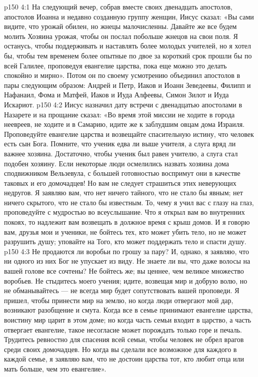 \vs p150 4:1 На следующий вечер, собрав вместе своих двенадцать апостолов, апостолов Иоанна и недавно созданную группу женщин, Иисус сказал: «Вы сами видите, что урожай обилен, но жнецы малочисленны. Давайте же все будем молить Хозяина урожая, чтобы он послал побольше жнецов на свои поля. Я останусь, чтобы поддерживать и наставлять более молодых учителей, но я хотел бы, чтобы тем временем более опытные по двое за короткий срок прошли бы по всей Галилее, проповедуя евангелие царства, пока еще можно это делать спокойно и мирно». Потом он по своему усмотрению объединил апостолов в пары следующим образом: Андрей и Петр, Иаков и Иоанн Зеведеевы, Филипп и Нафанаил, Фома и Матфей, Иаков и Иуда Алфеевы, Симон Зилот и Иуда Искариот.
\vs p150 4:2 Иисус назначил дату встречи с двенадцатью апостолами в Назарете и на прощание сказал: «Во время этой миссии не ходите в города неевреев, не ходите и в Самарию, идите же к заблудшим овцам дома Израиля. Проповедуйте евангелие царства и возвещайте спасительную истину, что человек есть сын Бога. Помните, что ученик едва ли выше учителя, а слуга вряд ли важнее хозяина. Достаточно, чтобы ученик был равен учителю, а слуга стал подобен хозяину. Если некоторые люди осмелились назвать хозяина дома сподвижником Вельзевула, с большей готовностью воспримут они в качестве таковых и его домочадцев! Но вам не следует страшиться этих неверующих недругов. Я заявляю вам, что нет ничего тайного, что не стало бы явным; нет ничего скрытого, что не стало бы известным. То, чему я учил вас с глазу на глаз, проповедуйте с мудростью во всеуслышание. Что я открыл вам во внутренних покоях, то надлежит вам возвещать в должное время с крыш домов. И я говорю вам, друзья мои и ученики, не бойтесь тех, кто может убить тело, но не может разрушить душу; уповайте на Того, кто может поддержать тело и спасти душу.
\vs p150 4:3 Не продаются ли воробьи по грошу за пару? И, однако, я заявляю, что ни одного из них Бог не упускает из виду. Не знаете ли вы, что даже волосы на вашей голове все сочтены? Не бойтесь же; вы ценнее, чем великое множество воробьев. Не стыдитесь моего учения; идите, возвещая мир и добрую волю, но не обманывайтесь --- не всегда мир будет сопутствовать вашей проповеди. Я пришел, чтобы принести мир на землю, но когда люди отвергают мой дар, возникают разобщение и смута. Когда все в семье принимают евангелие царства, воистину мир царит в этом доме; но когда часть семьи входит в царство, а часть отвергает евангелие, такое несогласие может порождать только горе и печаль. Трудитесь ревностно для спасения всей семьи, чтобы человек не обрел врагов среди своих домочадцев. Но когда вы сделали все возможное для каждого в каждой семье, я заявляю вам, что не достоин царства тот, кто любит отца или мать больше, чем это евангелие».
